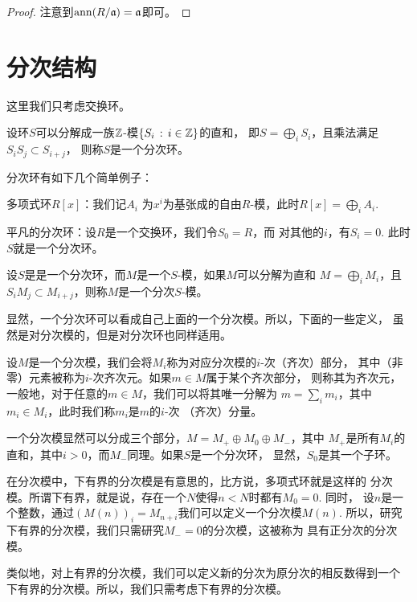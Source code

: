 \begin{proof}
	注意到$\operatorname{ann}(R/\mathfrak a)=\mathfrak a$即可。
\end{proof}

\section{分次结构}

这里我们只考虑交换环。

\begin{para}[分次环]
	设环$S$可以分解成一族$\mathbb{Z}$-模$\{S_i\,:\, i\in\mathbb{Z}\}$的直和，
	即$S=\bigoplus_i S_i$，且乘法满足$S_iS_j\subset S_{i+j}$，
	则称$S$是一个分次环。
\end{para}

分次环有如下几个简单例子：
\begin{compactenum}
\item 多项式环$R[x]$：我们记$A_i$
为$x^i$为基张成的自由$R$-模，此时$R[x]=\bigoplus_i A_i$. 
\item 平凡的分次环：设$R$是一个交换环，我们令$S_0=R$，而
对其他的$i$，有$S_i=0$. 此时$S$就是一个分次环。
\end{compactenum}

\begin{para}[分次模]
	设$S$是是一个分次环，而$M$是一个$S$-模，如果$M$可以分解为直和
	$M=\bigoplus_i M_i$，且$S_iM_j\subset M_{i+j}$，则称$M$是一个分次$S$-模。
\end{para}

显然，一个分次环可以看成自己上面的一个分次模。所以，下面的一些定义，
虽然是对分次模的，但是对分次环也同样适用。

\begin{para}
	设$M$是一个分次模，我们会将$M_i$称为对应分次模的$i$-次（齐次）部分，
	其中（非零）元素被称为$i$-次齐次元。如果$m\in M$属于某个齐次部分，
	则称其为齐次元，一般地，对于任意的$m\in M$，我们可以将其唯一分解为
	$m=\sum_i m_i$，其中$m_i\in M_i$，此时我们称$m_i$是$m$的$i$-次
	（齐次）分量。

	一个分次模显然可以分成三个部分，$M=M_+\oplus M_0\oplus M_-$，其中
	$M_+$是所有$M_i$的直和，其中$i>0$，而$M_-$同理。如果$S$是一个分次环，
	显然，$S_0$是其一个子环。

	在分次模中，下有界的分次模是有意思的，比方说，多项式环就是这样的
	分次模。所谓下有界，就是说，存在一个$N$使得$n<N$时都有$M_0=0$. 同时，
	设$n$是一个整数，通过$(M(n))_i=M_{n+i}$我们可以定义一个分次模$M(n)$.
	所以，研究下有界的分次模，我们只需研究$M_-=0$的分次模，这被称为
	具有正分次的分次模。

	类似地，对上有界的分次模，我们可以定义新的分次为原分次的相反数得到一个
	下有界的分次模。所以，我们只需考虑下有界的分次模。
\end{para}

